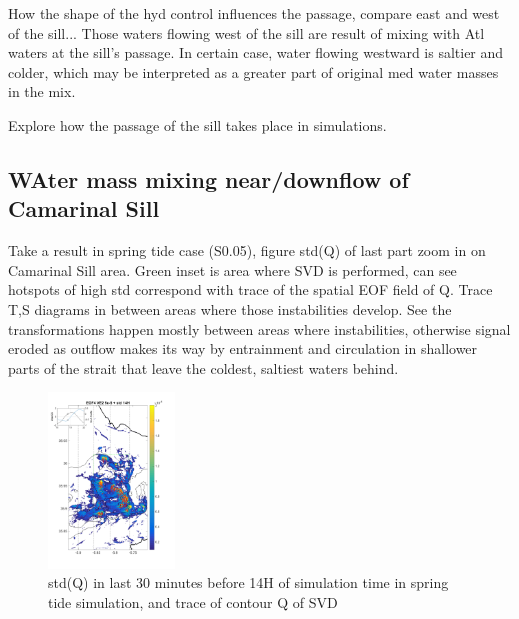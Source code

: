 How the shape of the hyd control influences the passage, compare east and west of the sill... 
Those waters flowing west of the sill are result of mixing with Atl waters at the sill's passage.
In certain case, water flowing westward is saltier and colder, which may be interpreted as a greater part of original med water masses in the mix.


Explore how the passage of the sill takes place in simulations.










\subsection{WAter mass mixing near/downflow of Camarinal Sill}

Take a result in spring tide case (S0.05), figure std(Q) of last part zoom in on Camarinal Sill area. Green inset is area where SVD is performed, can see hotspots of high std correspond with trace of the spatial EOF field of Q. Trace T,S diagrams in between areas where those instabilities develop. See the transformations happen mostly between areas where instabilities, otherwise signal eroded as outflow makes its way by entrainment and circulation in shallower parts of the strait that leave the coldest, saltiest waters behind.

\begin{figure}[!h]
 \includegraphics[width=0.3\textwidth]{./GBR3D/EOF_std_14hCso_traces.png}
 \caption {std(Q) in last 30 minutes before 14H of simulation time in spring tide simulation, and trace of contour Q of SVD}
\end{figure}

